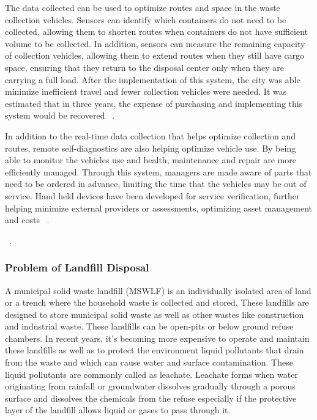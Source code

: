 \documentclass[sigconf]{acmart}
\begin{document}
The data collected can be used to optimize routes and space in the waste collection vehicles.  Sensors can identify which containers do not need to be collected, allowing them to shorten routes when containers do not have sufficient volume to be collected.  In addition, sensors can measure the remaining capacity of collection vehicles, allowing them to extend routes when they still have cargo space, ensuring that they return to the disposal center only when they are carrying a full load.  After the implementation of this system, the city was able minimize inefficient travel and fewer collection vehicles were needed.  It was estimated that in three years, the expense of purchasing and implementing this system would be recovered  ~\cite{shahrokni2014big}.

In addition to the real-time data collection that helps optimize collection and routes, remote self-diagnostics are also helping optimize vehicle use.  By being able to monitor the vehicles use and health, maintenance and repair are more efficiently managed.  Through this system, managers are made aware of parts that need to be ordered in advance, limiting the time that the vehicles may be out of service.  Hand held devices have been developed for service verification, further helping minimize external providers or assessments, optimizing asset management and costs ~\cite{megan2017}.


~\cite{shahrokni2014big}.

\subsubsection{Problem of Landfill Disposal}

A municipal solid waste landfill (MSWLF) is an individually isolated area of land or a trench where the household waste is collected and stored. These landfills are designed to store municipal solid waste as well as other wastes like construction and industrial waste. These landfills can be open-pits or below ground refuse chambers. In recent years, it's becoming more expensive to operate and maintain these landfills as well as to protect the environment liquid pollutants that drain from the waste and which can cause water and surface contamination. These liquid pollutants are commonly called as leachate. Leachate forms when water originating from rainfall or groundwater dissolves gradually through a porous surface and dissolves the chemicals from the refuse especially if the protective layer of the landfill allows liquid or gases to pass through it. 
\end{document}
